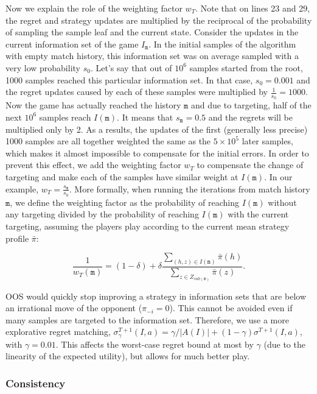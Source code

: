 \documentclass{aamas2015}
\newcommand{\ttm}{\mathtt{m}}
\begin{document}
Now we explain the role of the weighting factor $w_T$. Note that on lines 23 and 29, the regret and strategy updates are multiplied by the reciprocal of the probability of sampling the sample leaf and the current state. 
Consider the updates in the current information set of the game $I_\ttm$. In the initial samples of the algorithm with empty match history, this information set was on average sampled with a very low probability $s_0$. Let's say that out of $10^6$ samples started from the root, 1000 samples reached this particular information set. In that case, $s_0=0.001$ and the regret updates caused by each of these samples were multiplied by $\frac{1}{s_0}=1000$.
Now the game has actually reached the history $\ttm$ and due to targeting, half of the next $10^6$ samples reach $I(\ttm)$. It means that $s_\ttm=0.5$ and the regrets will be multiplied only by 2.
As a results, the updates of the first (generally less precise) 1000 samples are all together weighted the same as the $5\times 10^5$ later samples, which makes it almost impossible to compensate for the initial errors.
In order to prevent this effect, we add the weighting factor $w_T$ to compensate the change of targeting and make each of the samples have similar weight at $I(\ttm)$. 
In our example, $w_T=\frac{s_\ttm}{s_0}$. More formally, when running the iterations from match history $\ttm$, we define the weighting factor as the probability of reaching $I(\ttm)$ without any targeting divided by the probability of reaching $I(\ttm)$ with the current targeting, assuming the players play according to the current mean strategy profile $\bar{\pi}$:

\vskip-6mm
\begin{equation}
\frac{1}{w_T(\ttm)} = (1-\delta) + \delta\frac{\sum_{(h,z)\in I(\ttm)} \bar{\pi}(h)}{\sum_{z\in Z_{sub(\ttm)}} \bar{\pi}(z)}.
\end{equation}

OOS would quickly stop improving a strategy in information sets that are below an irrational move of the opponent ($\pi_{-i}=0$). This cannot be avoided even if many samples are targeted to the information set. Therefore, we use a more explorative regret matching, 
$\sigma^{T+1}_\gamma(I,a) = \gamma/|A(I)| + (1-\gamma) \sigma^{T+1}(I,a)$, with $\gamma = 0.01$. 
This affects the worst-case regret bound at most by $\gamma$ (due to the linearity of the expected utility), but allows for much better play.



\subsubsection{Consistency}
\end{document}
